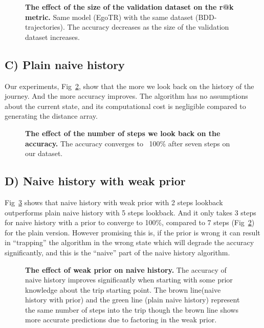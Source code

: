 \documentclass[10pt,letterpaper]{article}
\begin{document}
\begin{figure}[!h]
  \caption{{\bf The effect of the size of the validation dataset on the r@k metric.}  Same model (EgoTR) with the same dataset (BDD-trajectories). The accuracy decreases as the size of the validation dataset increases.}
  \label{fig17}
\end{figure}
\subsection*{C) Plain naive history}
Our experiments, Fig~\ref{fig18}, show that the more we look back on the history of the journey. And the more accuracy improves. The algorithm has no assumptions about the current state, and its computational cost is negligible compared to generating the distance array.


\begin{figure}[!h]
  \caption{{\bf The effect of the number of steps we look back on the accuracy.} The accuracy converges to ~100\% after seven steps on our dataset.}
  \label{fig18}
\end{figure}

\subsection*{D) Naive history with weak prior}
Fig~\ref{fig19} shows that naive history with weak prior with 2 steps lookback outperforms plain naive history with 5 steps lookback. And it only takes 3 steps for naive history with a prior to converge to 100\%, compared to 7 steps (Fig~\ref{fig18}) for the plain version. 
However promising this is, if the prior is wrong it can result in “trapping” the algorithm in the wrong state which will degrade the accuracy significantly, and this is the “naive” part of the naive history algorithm.

\begin{figure}[!h]
  \caption{{\bf The effect of weak prior on naive history.}  The accuracy of naive history improves significantly when starting with some prior knowledge about the trip starting point. The brown line(naive history with prior) and the green line (plain naive history) represent the same number of steps into the trip though the brown line shows more accurate predictions due to factoring in the weak prior.}
  \label{fig19}
\end{figure}
\end{document}

